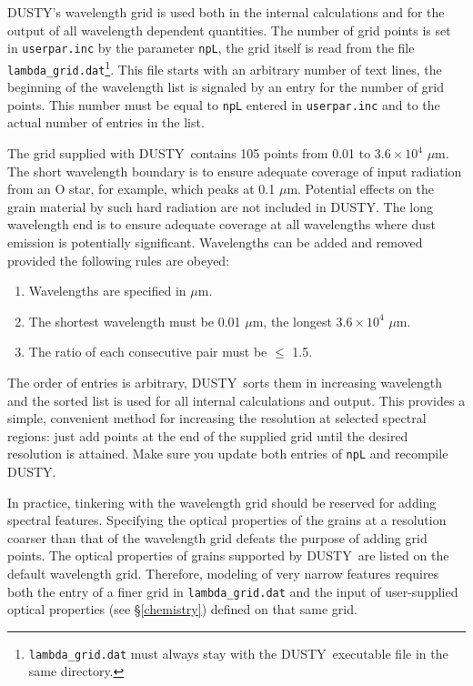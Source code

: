 \documentclass[11pt]{article}
\def\D  {{\sf DUSTY}}
\def\mic    {\hbox{$\mu$m}}
\begin{document}
\D's wavelength grid is used both in the internal calculations and for the
output of all wavelength dependent quantities. The number of grid points is set
in {\tt userpar.inc} by the parameter {\tt npL}, the grid itself is read from
the file {\tt lambda\_grid.dat}\footnote{{\tt lambda\_grid.dat} must always
stay with the \D\ executable file in the same directory.}. This file starts
with an arbitrary number of text lines, the beginning of the wavelength list is
signaled by an entry for the number of grid points.  This number must be equal
to {\tt npL} entered in {\tt userpar.inc} and to the actual number of entries
in the list.

The grid supplied with \D\ contains 105 points from 0.01 to $3.6\times10^{4}$
\mic.  The short wavelength boundary is to ensure adequate coverage of input
radiation from an O star, for example, which peaks at 0.1 \mic.  Potential
effects on the grain material by such hard radiation are not included in \D.
The long wavelength end is to ensure adequate coverage at all wavelengths where
dust emission is potentially significant. Wavelengths can be added and removed
provided the following rules are obeyed:
\begin{enumerate}
\item Wavelengths are specified in \mic.
\item The shortest wavelength must be 0.01 \mic, the longest
    $3.6\times10^{4}$ \mic.
\item The ratio of each consecutive pair must be $\le$ 1.5.
\end{enumerate}
The order of entries is arbitrary, \D\ sorts them in increasing wavelength and
the sorted list is used for all internal calculations and output.  This
provides a simple, convenient method for increasing the resolution at selected
spectral regions: just add points at the end of the supplied grid until the
desired resolution is attained.  Make sure you update both entries of {\tt npL}
and recompile \D.

In practice, tinkering with the wavelength grid should be reserved for adding
spectral features. Specifying the optical properties of the grains at a
resolution coarser than that of the wavelength grid defeats the purpose of
adding grid points. The optical properties of grains supported by \D\ are
listed on the default wavelength grid.  Therefore, modeling of very narrow
features requires both the entry of a finer grid in {\tt lambda\_grid.dat} and
the input of user-supplied optical properties (see \S\ref{chemistry}) defined
on that same grid.
\end{document}
